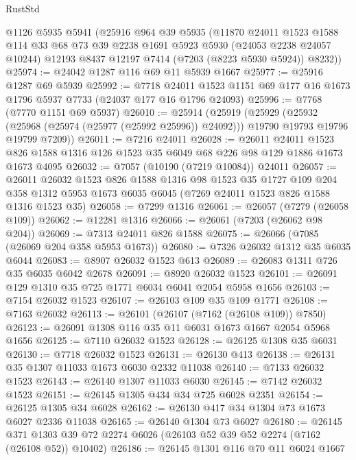 \begin{lexlean}{RustStd}
\begin{coremodule}
    @1126
    @5935
    @5941
    (@25916
      @964
      @39
      @5935
      (@11870
        @24011
        @1523
        @1588
        @114
        @33
        @68
        @73
        @39
        @2238
        @1691
        @5923
        @5930
        (@24053 @2238 @24057 @10244)
        @12193
        @8437
        @12197
        @7414
        (@7203 (@8223 @5930 @5924))
        @8232))
@25974 := @24042 @1287 @116 @69 @11 @5939 @1667
@25977 := @25916 @1287 @69 @5939
@25992 := @7718
    @24011
    @1523
    @1151
    @69
    @177
    @16
    @1673
    @1796
    @5937
    @7733
    (@24037 @177 @16 @1796 @24093)
@25996 := @7768 (@7770 @1151 @69 @5937)
@26010 := @25914
    (@25919
      (@25929
        (@25932 (@25968 (@25974 (@25977 (@25992 @25996)) @24092)))
        @19790
        @19793
        @19796
        @19799
        @7209))
@26011 := @7216 @24011
@26028 := @26011
    @24011
    @1523
    @826
    @1588
    @1316
    @126
    @1523
    @35
    @6049
    @68
    @226
    @98
    @129
    @1886
    @1673
    @1673
    @4095
@26032 := @7057 (@10190 (@7219 @10084)) @24011
@26057 := @26011
    @26032
    @1523
    @826
    @1588
    @1316
    @98
    @1523
    @35
    @1727
    @109
    @204
    @358
    @1312
    @5953
    @1673
    @6035
    @6045
    (@7269 @24011 @1523 @826 @1588 @1316 @1523 @35)
@26058 := @7299 @1316
@26061 := @26057 (@7279 (@26058 @109))
@26062 := @12281 @1316
@26066 := @26061 (@7203 (@26062 @98 @204))
@26069 := @7313 @24011 @826 @1588
@26075 := @26066 (@7085 (@26069 @204 @358 @5953 @1673))
@26080 := @7326 @26032 @1312 @35 @6035 @6044
@26083 := @8907 @26032 @1523 @613
@26089 := @26083 @1311 @726 @35 @6035 @6042 @2678
@26091 := @8920 @26032 @1523
@26101 := @26091 @129 @1310 @35 @725 @1771 @6034 @6041 @2054 @5958 @1656
@26103 := @7154 @26032 @1523
@26107 := @26103 @109 @35 @109 @1771
@26108 := @7163 @26032
@26113 := @26101 (@26107 (@7162 (@26108 @109)) @7850)
@26123 := @26091 @1308 @116 @35 @11 @6031 @1673 @1667 @2054 @5968 @1656
@26125 := @7110 @26032 @1523
@26128 := @26125 @1308 @35 @6031
@26130 := @7718 @26032 @1523
@26131 := @26130 @413
@26138 := @26131 @35 @1307 @11033 @1673 @6030 @2332 @11038
@26140 := @7133 @26032 @1523
@26143 := @26140 @1307 @11033 @6030
@26145 := @7142 @26032 @1523
@26151 := @26145 @1305 @434 @34 @725 @6028 @2351
@26154 := @26125 @1305 @34 @6028
@26162 := @26130 @417 @34 @1304 @73 @1673 @6027 @2336 @11038
@26165 := @26140 @1304 @73 @6027
@26180 := @26145
    @371
    @1303
    @39
    @72
    @2274
    @6026
    (@26103 @52 @39 @52 @2274 (@7162 (@26108 @52)) @10402)
@26186 := @26145 @1301 @116 @70 @11 @6024 @1667

\end{coremodule}
\end{lexlean}
